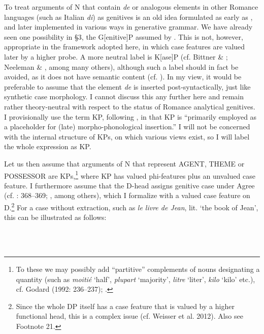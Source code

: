 \documentclass[output=paper]{langsci/langscibook}
\begin{document}
  To treat arguments of N that contain \textit{de} or analogous elements in other Romance languages (such as Italian \textit{di}) as genitives is an old idea formulated as early as \citet{Benveniste1966}, and later implemented in various ways in generative grammar. We have already seen one possibility in §3, the G[enitive]P assumed by \citet{Cinque2014}. This is not, however, appropriate in the framework adopted here, in which case features are valued later by a higher probe. A more neutral label is K[ase]P (cf. Bittner \& \citealt{Hale1996}; Neeleman \& \citealt{Weerman1999}, among many others), although such a label should in fact be avoided, as it does not have semantic content (cf. \citealt{Chomsky1995}). In my view, it would be preferable to assume that the element \textit{de} is inserted post-syntactically, just like synthetic case morphology. I cannot discuss this any further here and remain rather theory-neutral with respect to the status of Romance analytical genitives. I provisionally use the term KP, following \citet[23]{Biggs2014}, in that KP is “primarily employed as a placeholder for (late) morpho-phonological insertion.” I will not be concerned with the internal structure of KPs, on which various views exist, so I will label the whole expression as KP.

  Let us then assume that arguments of N that represent AGENT, THEME or POSSESSOR are KPs,\footnote{To these we may possibly add “partitive” complements of nouns designating a quantity (such as \textit{moitié} ‘half’, \textit{plupart} ‘majority’, \textit{litre} ‘liter’, \textit{kilo} ‘kilo’ etc.), cf. Godard (1992: 236–237); \citet{Doetjes1997}.} where KP has valued phi-features plus an unvalued case feature. I furthermore assume that the D-head assigns genitive case under Agree (cf. \citealt{Radford2004}: 368–369; \citealt{Rappaport2006}, among others), which I formalize with a valued case feature on D.\footnote{Since the whole DP itself has a case feature that is valued by a higher functional head, this is a complex issue (cf. Weisser et al. 2012). Also see Footnote 21.} For a case without extraction, such as \textit{le livre de Jean}, lit. ‘the book of Jean’, this can be illustrated as follows:

    
 

\begin{styleFramecontents}
\ea%
    \label{ex:key:26}
    \gll\\
        \\
    \glt
    \z

        
\end{styleFramecontents}
\end{document}
